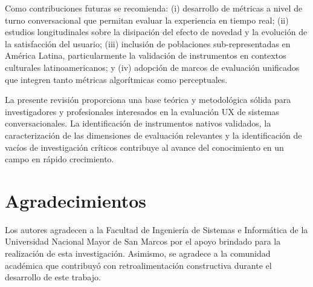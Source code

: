 \documentclass[11pt,twocolumn]{article}
\begin{document}
Como contribuciones futuras se recomienda: (i) desarrollo de métricas a nivel de turno conversacional que permitan evaluar la experiencia en tiempo real; (ii) estudios longitudinales sobre la disipación del efecto de novedad y la evolución de la satisfacción del usuario; (iii) inclusión de poblaciones sub-representadas en América Latina, particularmente la validación de instrumentos en contextos culturales latinoamericanos; y (iv) adopción de marcos de evaluación unificados que integren tanto métricas algorítmicas como perceptuales.

La presente revisión proporciona una base teórica y metodológica sólida para investigadores y profesionales interesados en la evaluación UX de sistemas conversacionales. La identificación de instrumentos nativos validados, la caracterización de las dimensiones de evaluación relevantes y la identificación de vacíos de investigación críticos contribuye al avance del conocimiento en un campo en rápido crecimiento.

\section{Agradecimientos}

Los autores agradecen a la Facultad de Ingeniería de Sistemas e Informática de la Universidad Nacional Mayor de San Marcos por el apoyo brindado para la realización de esta investigación. Asimismo, se agradece a la comunidad académica que contribuyó con retroalimentación constructiva durante el desarrollo de este trabajo.
\end{document}
